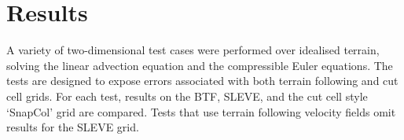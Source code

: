 \chapter{Results}
\label{sec:results}

A variety of two-dimensional test cases were performed over idealised terrain, solving the linear advection equation and the compressible Euler equations.  The tests are designed to expose errors associated with both terrain following and cut cell grids.
For each test, results on the BTF, SLEVE, and the cut cell style `SnapCol' grid are compared.  Tests that use terrain following velocity fields omit results for the SLEVE grid.






